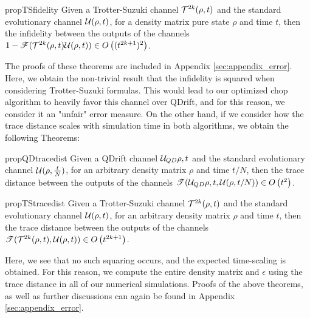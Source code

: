  \begin{restatable}{prop}{TSfidelity} \label{thm:TSfidelity}
Given a Trotter-Suzuki channel $\mathcal{T}^{2k}{( \rho, t )}$ and the standard evolutionary channel $\mathcal{U}{ ( \rho, t ) }$, for a density matrix pure state $\rho$ and time $t$, then the infidelity between the outputs of the channels $1 - \mathscr{F}(\mathcal{T}^{2k}{( \rho, t )} \mathcal{U}(\rho, t)) \in O\left( (t^{2k+1})^2 \right)$.
\end{restatable}

The proofs of these theorems are included in  Appendix \ref{sec:appendix_error}. Here, we obtain the non-trivial result that the infidelity is squared when considering Trotter-Suzuki formulas. This would lead to our optimized chop algorithm to heavily favor this channel over QDrift, and for this reason, we consider it an "unfair" error measure. On the other hand, if we consider how the trace distance scales with simulation time in both algorithms, we obtain the following Theorems:

\begin{restatable}{prop}{QDtracedist} \label{thm:QDtracedist}
Given a QDrift channel $\mathcal{U}_{QD}{\rho, t}$ and the standard evolutionary channel $\mathcal{U}(\rho, \frac{t}{N})$, for an arbitrary density matrix $\rho$ and time $t/N$, then the trace distance between the outputs of the channels $\mathscr{T}(\mathcal{U}_{QD}{\rho, t}, \mathcal{U}(\rho, t/N)) \in O\left( t^2 \right)$.
\end{restatable}

\begin{restatable}{prop}{TStracedist} \label{thm:TStracedist}
    Given a Trotter-Suzuki channel $\mathcal{T}^{2k}{( \rho, t )}$ and the standard evolutionary channel $\mathcal{U}{ ( \rho, t ) }$, for an arbitrary density matrix $\rho$ and time $t$, then the trace distance between the outputs of the channels $\mathscr{T}(\mathcal{T}^{2k}{( \rho, t )}, \mathcal{U}(\rho, t)) \in O\left( t^{2k+1} \right)$.
\end{restatable}

Here, we see that no such squaring occurs, and the expected time-scaling is obtained. For this reason, we compute the entire density matrix and  $\epsilon$ using the trace distance in all of our numerical simulations. Proofs of the above theorems, as well as further discussions can again be found in Appendix \ref{sec:appendix_error}.

